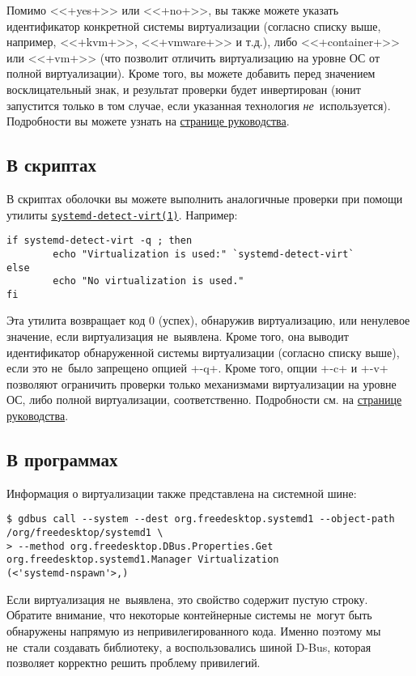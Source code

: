 \documentclass[10pt,oneside,a4paper]{article}
\newcommand{\hreftt}[2]{\href{#1}{\texttt{#2}}}
\begin{document}
Помимо <<+yes+>> или <<+no+>>, вы также можете указать идентификатор конкретной
системы виртуализации (согласно списку выше, например, <<+kvm+>>, <<+vmware+>> и
т.д.), либо <<+container+>> или <<+vm+>> (что позволит отличить виртуализацию на
уровне ОС от полной виртуализации). Кроме того, вы можете добавить перед
значением восклицательный знак, и результат проверки будет инвертирован (юнит
запустится только в том случае, если указанная технология
\emph{не}~используется). Подробности вы можете узнать на
\href{http://www.freedesktop.org/software/systemd/man/systemd.unit.html}{странице
руководства}.

\subsection{В скриптах}

В скриптах оболочки вы можете выполнить аналогичные проверки при помощи утилиты
\hreftt{http://www.freedesktop.org/software/systemd/man/systemd-detect-virt.html}{systemd-detect-virt(1)}.
Например:
\begin{Verbatim}
if systemd-detect-virt -q ; then
        echo "Virtualization is used:" `systemd-detect-virt`
else
        echo "No virtualization is used."
fi
\end{Verbatim}

Эта утилита возвращает код 0 (успех), обнаружив виртуализацию, или ненулевое
значение, если виртуализация не~выявлена. Кроме того, она выводит идентификатор
обнаруженной системы виртуализации (согласно списку выше), если это не~было
запрещено опцией +-q+. Кроме того, опции +-c+ и +-v+ позволяют ограничить
проверки только механизмами виртуализации на уровне ОС, либо полной
виртуализации, соответственно. Подробности см. на
\href{http://www.freedesktop.org/software/systemd/man/systemd-detect-virt.html}{странице
руководства}.

\subsection{В программах}

Информация о виртуализации также представлена на системной шине:
\begin{Verbatim}
$ gdbus call --system --dest org.freedesktop.systemd1 --object-path /org/freedesktop/systemd1 \
> --method org.freedesktop.DBus.Properties.Get org.freedesktop.systemd1.Manager Virtualization
(<'systemd-nspawn'>,)
\end{Verbatim}

Если виртуализация не~выявлена, это свойство содержит пустую строку. Обратите
внимание, что некоторые контейнерные системы не~могут быть обнаружены напрямую
из непривилегированного кода. Именно поэтому мы не~стали создавать библиотеку, а
воспользовались шиной D-Bus, которая позволяет корректно решить проблему
привилегий.
\end{document}

